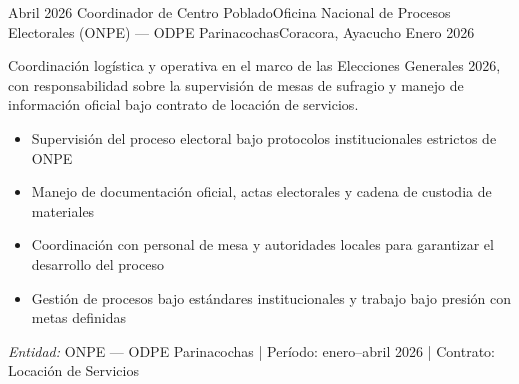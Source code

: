 \experience
{Abril 2026} {Coordinador de Centro Poblado}{Oficina Nacional de Procesos Electorales (ONPE) — ODPE Parinacochas}{Coracora, Ayacucho}
{Enero 2026} {
	Coordinación logística y operativa en el marco de las Elecciones Generales 2026, con responsabilidad sobre la supervisión de mesas de sufragio y manejo de información oficial bajo contrato de locación de servicios.
	\begin{itemize}
		\item Supervisión del proceso electoral bajo protocolos institucionales estrictos de ONPE
		\item Manejo de documentación oficial, actas electorales y cadena de custodia de materiales
		\item Coordinación con personal de mesa y autoridades locales para garantizar el desarrollo del proceso
		\item Gestión de procesos bajo estándares institucionales y trabajo bajo presión con metas definidas
	\end{itemize}
}
{\footnotesize{\emph{Entidad:} ONPE — ODPE Parinacochas | Período: enero–abril 2026 | Contrato: Locación de Servicios}}
